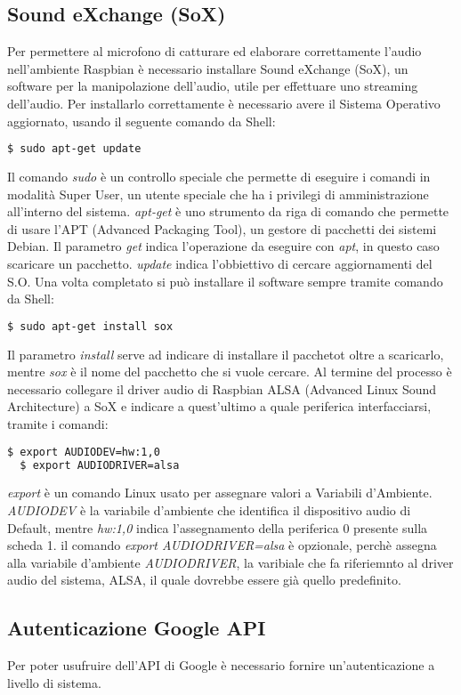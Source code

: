 \subsection{Sound eXchange (SoX)}
Per permettere al microfono di catturare ed elaborare correttamente l'audio nell'ambiente
Raspbian è necessario installare Sound eXchange (SoX), un software per la manipolazione
dell'audio, utile per effettuare uno streaming dell'audio.
Per installarlo correttamente è necessario avere il Sistema Operativo aggiornato,
usando il seguente comando da Shell:
\begin{lstlisting}[language=bash]
  $ sudo apt-get update
\end{lstlisting}
Il comando \textit{sudo} è un controllo speciale che permette di eseguire i comandi in modalità
Super User, un utente speciale che ha i privilegi di amministrazione all'interno del sistema.
\textit{apt-get} è uno strumento da riga di comando che permette di usare l'APT (Advanced Packaging Tool),
un gestore di pacchetti dei sistemi Debian.
Il parametro \textit{get} indica l'operazione da eseguire con \textit{apt}, in questo caso scaricare
un pacchetto.
\textit{update} indica l'obbiettivo di cercare aggiornamenti del S.O.
Una volta completato si può installare il software sempre tramite comando da Shell:
\begin{lstlisting}[language=bash]
  $ sudo apt-get install sox
\end{lstlisting}
Il parametro \textit{install} serve ad indicare di installare il pacchetot oltre a scaricarlo, mentre \textit{sox}
è il nome del pacchetto che si vuole cercare.
Al termine del processo è necessario collegare il driver audio di Raspbian ALSA (Advanced Linux Sound Architecture)
a SoX e indicare a quest'ultimo a quale periferica interfacciarsi, tramite i comandi:
\begin{lstlisting}[language=bash]
  $ export AUDIODEV=hw:1,0
  $ export AUDIODRIVER=alsa
\end{lstlisting}
\textit{export} è un comando Linux usato per assegnare valori a Variabili d'Ambiente.
\textit{AUDIODEV} è la variabile d'ambiente che identifica il dispositivo audio di Default, mentre
\textit{hw:1,0} indica l'assegnamento della periferica 0 presente sulla scheda 1.
il comando \textit{export AUDIODRIVER=alsa} è opzionale, perchè assegna alla variabile d'ambiente
\textit{AUDIODRIVER}, la varibiale che fa riferiemnto al driver audio del sistema, ALSA,
il quale dovrebbe essere già quello predefinito.

\subsection{Autenticazione Google API}
Per poter usufruire dell'API di Google è necessario fornire un'autenticazione a livello
di sistema.
